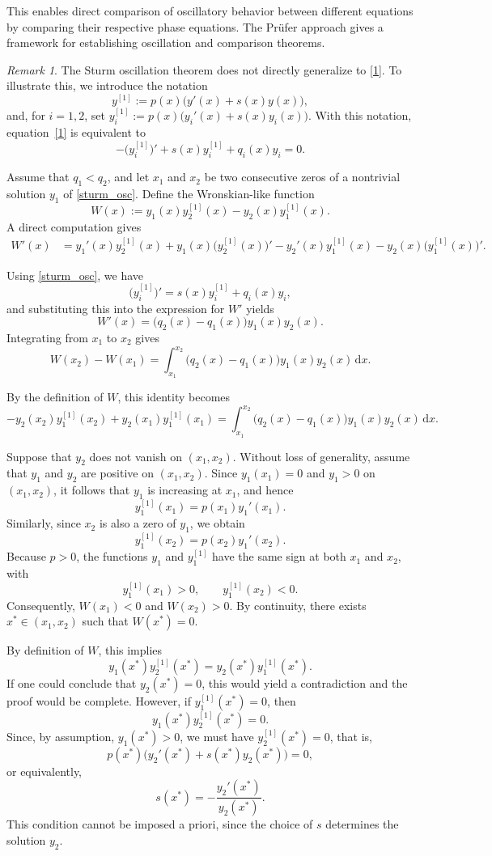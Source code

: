 \documentclass[11pt, reqno]{amsart}
\numberwithin{equation}{section}  %
\theoremstyle{plain}
\theoremstyle{definition}
\theoremstyle{remark}
\newtheorem{remark}[theorem]{Remark}
\begin{document}
This enables direct comparison of oscillatory behavior between different equations by comparing their respective phase equations. The Pr\"ufer approach gives a framework for establishing oscillation and comparison theorems.
\begin{remark}
The Sturm oscillation theorem does not directly generalize to \eqref{1}. 
To illustrate this, we introduce the notation
\[
y^{[1]} := p(x)\bigl(y'(x)+s(x)y(x)\bigr),
\]
and, for $i=1,2$, set $y_i^{[1]} := p(x)\bigl(y_i'(x)+s(x)y_i(x)\bigr)$.
With this notation, equation~\eqref{1} is equivalent to
\begin{equation}\label{sturm_osc}
-\bigl(y_i^{[1]}\bigr)' + s(x)y_i^{[1]} + q_i(x)y_i = 0 .
\end{equation}

Assume that $q_1<q_2$, and let $x_1$ and $x_2$ be two consecutive zeros of a nontrivial solution $y_1$ of \eqref{sturm_osc}.
Define the Wronskian-like function
\[
W(x) := y_1(x)y_2^{[1]}(x) - y_2(x)y_1^{[1]}(x).
\]
A direct computation gives
\[
\begin{aligned}
W'(x)
&= y_1'(x)y_2^{[1]}(x) + y_1(x)\bigl(y_2^{[1]}(x)\bigr)'
   - y_2'(x)y_1^{[1]}(x) - y_2(x)\bigl(y_1^{[1]}(x)\bigr)' .
\end{aligned}
\]

Using \eqref{sturm_osc}, we have
\[
\bigl(y_i^{[1]}\bigr)' = s(x)y_i^{[1]} + q_i(x)y_i ,
\]
and substituting this into the expression for $W'$ yields
\[
W'(x) = \bigl(q_2(x)-q_1(x)\bigr)y_1(x)y_2(x).
\]
Integrating from $x_1$ to $x_2$ gives
\[
W(x_2)-W(x_1)
= \int_{x_1}^{x_2} \bigl(q_2(x)-q_1(x)\bigr)y_1(x)y_2(x)\,\mathrm{d}x .
\]

By the definition of $W$, this identity becomes
\[
- y_2(x_2)y_1^{[1]}(x_2) + y_2(x_1)y_1^{[1]}(x_1)
= \int_{x_1}^{x_2} \bigl(q_2(x)-q_1(x)\bigr)y_1(x)y_2(x)\,\mathrm{d}x .
\]

Suppose that $y_2$ does not vanish on $(x_1,x_2)$.
Without loss of generality, assume that $y_1$ and $y_2$ are positive on $(x_1,x_2)$.
Since $y_1(x_1)=0$ and $y_1>0$ on $(x_1,x_2)$, it follows that $y_1$ is increasing at $x_1$, and hence
\[
y_1^{[1]}(x_1) = p(x_1)y_1'(x_1).
\]
Similarly, since $x_2$ is also a zero of $y_1$, we obtain
\[
y_1^{[1]}(x_2) = p(x_2)y_1'(x_2).
\]
Because $p>0$, the functions $y_1$ and $y_1^{[1]}$ have the same sign at both $x_1$ and $x_2$, with
\[
y_1^{[1]}(x_1)>0,
\qquad
y_1^{[1]}(x_2)<0.
\]
Consequently, $W(x_1)<0$ and $W(x_2)>0$.
By continuity, there exists $x^*\in(x_1,x_2)$ such that $W(x^*)=0$.

By definition of $W$, this implies
\[
y_1(x^*)y_2^{[1]}(x^*) = y_2(x^*)y_1^{[1]}(x^*).
\]
If one could conclude that $y_2(x^*)=0$, this would yield a contradiction and the proof would be complete. However, if $y_1^{[1]}(x^*)=0$, then
\[
y_1(x^*)y_2^{[1]}(x^*) = 0.
\]
Since, by assumption, $y_1(x^*)>0$, we must have $y_2^{[1]}(x^*)=0$, that is,
\[
p(x^*)\bigl(y_2'(x^*)+s(x^*)y_2(x^*)\bigr)=0,
\]
or equivalently,
\[
s(x^*) = -\frac{y_2'(x^*)}{y_2(x^*)}.
\]
This condition cannot be imposed a priori, since the choice of $s$ determines the solution $y_2$.
\end{remark}
\end{document}
